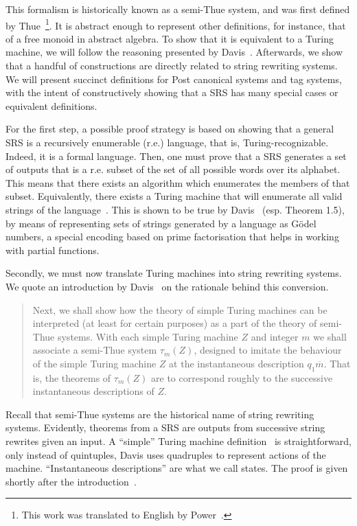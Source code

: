 \documentclass[12pt]{article}
\begin{document}
This formalism is historically known as a semi-Thue system, and was first defined by Thue~\cite{Thue:article:1914:may}\footnote{This work was translated to English by Power~\cite{Power:misc:2013:aug}.}. It is abstract enough to represent other definitions, for instance, that of a free monoid in abstract algebra. To show that it is equivalent to a Turing machine, we will follow the reasoning presented by Davis~\cite{Davis:book:1958}. Afterwards, we show that a handful of constructions are directly related to string rewriting systems. We will present succinct definitions for Post canonical systems and tag systems, with the intent of constructively showing that a SRS has many special cases or equivalent definitions.

For the first step, a possible proof strategy is based on showing that a general SRS is a recursively enumerable (r.e.) language, that is, Turing-recognizable. Indeed, it is a formal language. Then, one must prove that a SRS generates a set of outputs that is a r.e. subset of the set of all possible words over its alphabet. This means that there exists an algorithm which enumerates the members of that subset. Equivalently, there exists a Turing machine that will enumerate all valid strings of the language~\cite[Theorem 3.21]{Sipser:book:2012}. This is shown to be true by Davis~\cite[pp. 84--86]{Davis:book:1958} (esp. Theorem 1.5), by means of representing sets of strings generated by a language as Gödel numbers, a special encoding based on prime factorisation that helps in working with partial functions.

Secondly, we must now translate Turing machines into string rewriting systems. We quote an introduction by Davis~\cite[Sec. 6.2]{Davis:book:1958} on the rationale behind this conversion.

\begin{quote}
    Next, we shall show how the theory of simple Turing machines can be interpreted (at least for certain purposes) as a part of the theory of semi-Thue systems. With each simple Turing machine $Z$ and integer $m$ we shall associate a semi-Thue system $\tau_{m}(Z)$, designed to imitate the behaviour of the simple Turing machine $Z$ at the instantaneous description $q_{1}\overline{m}$. That is, the theorems of $\tau_{m}(Z)$ are to correspond roughly to the successive instantaneous descriptions of $Z$.
\end{quote}

Recall that semi-Thue systems are the historical name of string rewriting systems. Evidently, theorems from a SRS are outputs from successive string rewrites given an input. A ``simple'' Turing machine definition~\cite[Sec. 1.1, Def. 1.3]{Davis:book:1958} is straightforward, only instead of quintuples, Davis uses quadruples to represent actions of the machine. ``Instantaneous descriptions'' are what we call states. The proof is given shortly after the introduction~\cite[pp. 88--93]{Davis:book:1958}. 
\end{document}

